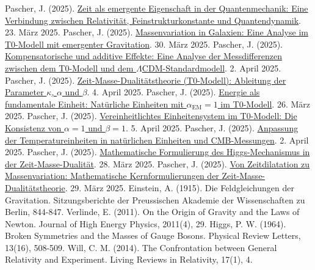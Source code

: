 \documentclass[12pt,a4paper]{article}
\newcommand{\alphaEM}{\alpha_{\text{EM}}}
\begin{document}
	\begin{thebibliography}{9}
		 Pascher, J. (2025). \href{https://github.com/jpascher/T0-Time-Mass-Duality/tree/main/2/pdf/Deutsch/NatEinheitenAlpha1.pdf}{Zeit als emergente Eigenschaft in der Quantenmechanik: Eine Verbindung zwischen Relativität, Feinstrukturkonstante und Quantendynamik}. 23. März 2025.
		 Pascher, J. (2025). \href{https://github.com/jpascher/T0-Time-Mass-Duality/tree/main/2/pdf/Deutsch/MassVarGalaxien.pdf}{Massenvariation in Galaxien: Eine Analyse im T0-Modell mit emergenter Gravitation}. 30. März 2025.
		 Pascher, J. (2025). \href{https://github.com/jpascher/T0-Time-Mass-Duality/tree/main/2/pdf/Deutsch/MessdifferenzenT0Standard.pdf}{Kompensatorische und additive Effekte: Eine Analyse der Messdifferenzen zwischen dem T0-Modell und dem \(\Lambda\)CDM-Standardmodell}. 2. April 2025.
		 Pascher, J. (2025). \href{https://github.com/jpascher/T0-Time-Mass-Duality/tree/main/2/pdf/Deutsch/ZeitMasseT0Params.pdf}{Zeit-Masse-Dualitätstheorie (T0-Modell): Ableitung der Parameter \(\kappa\), \(\alpha\) und \(\beta\)}. 4. April 2025.
		 Pascher, J. (2025). \href{https://github.com/jpascher/T0-Time-Mass-Duality/tree/main/2/pdf/Deutsch/NatEinheitenAlpha1.pdf}{Energie als fundamentale Einheit: Natürliche Einheiten mit \(\alphaEM = 1\) im T0-Modell}. 26. März 2025.
		 Pascher, J. (2025). \href{https://github.com/jpascher/T0-Time-Mass-Duality/tree/main/2/pdf/Deutsch/Alpha1Beta1Konsistenz.pdf}{Vereinheitlichtes Einheitensystem im T0-Modell: Die Konsistenz von \(\alpha = 1\) und \(\beta = 1\)}. 5. April 2025.
		 Pascher, J. (2025). \href{https://github.com/jpascher/T0-Time-Mass-Duality/tree/main/2/pdf/Deutsch/NatEinheitenAlpha1.pdf}{Anpassung der Temperatureinheiten in natürlichen Einheiten und CMB-Messungen}. 2. April 2025.
		 Pascher, J. (2025). \href{https://github.com/jpascher/T0-Time-Mass-Duality/tree/main/2/pdf/Deutsch/MathHiggsZeitMasse.pdf}{Mathematische Formulierung des Higgs-Mechanismus in der Zeit-Masse-Dualität}. 28. März 2025.
		 Pascher, J. (2025). \href{https://github.com/jpascher/T0-Time-Mass-Duality/tree/main/2/pdf/Deutsch/MathZeitMasseLagrange.pdf}{Von Zeitdilatation zu Massenvariation: Mathematische Kernformulierungen der Zeit-Masse-Dualitätstheorie}. 29. März 2025.
		 Einstein, A. (1915). Die Feldgleichungen der Gravitation. Sitzungsberichte der Preussischen Akademie der Wissenschaften zu Berlin, 844-847.
		 Verlinde, E. (2011). On the Origin of Gravity and the Laws of Newton. Journal of High Energy Physics, 2011(4), 29.
		 Higgs, P. W. (1964). Broken Symmetries and the Masses of Gauge Bosons. Physical Review Letters, 13(16), 508-509.
		 Will, C. M. (2014). The Confrontation between General Relativity and Experiment. Living Reviews in Relativity, 17(1), 4.
	\end{thebibliography}
	
\end{document}

